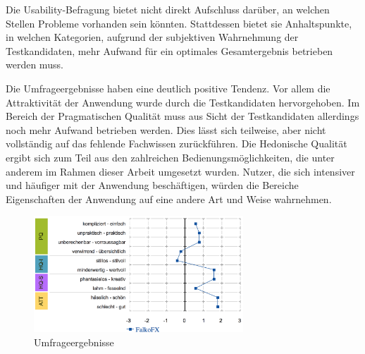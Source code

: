 Die Usability-Befragung bietet nicht direkt Aufschluss darüber, an welchen Stellen Probleme vorhanden sein könnten. Stattdessen bietet sie Anhaltspunkte, in welchen Kategorien, aufgrund der subjektiven Wahrnehmung der Testkandidaten, mehr Aufwand für ein optimales Gesamtergebnis betrieben werden muss.\par
Die Umfrageergebnisse haben eine deutlich positive Tendenz. Vor allem die Attraktivität der Anwendung wurde durch die Testkandidaten hervorgehoben. Im Bereich der Pragmatischen Qualität muss aus Sicht der Testkandidaten allerdings noch mehr Aufwand betrieben werden. Dies lässt sich teilweise, aber nicht vollständig auf das fehlende Fachwissen zurückführen. Die Hedonische Qualität ergibt sich zum Teil aus den zahlreichen Bedienungsmöglichkeiten, die unter anderem im Rahmen dieser Arbeit umgesetzt wurden. Nutzer, die sich intensiver und häufiger mit der Anwendung beschäftigen, würden die Bereiche Eigenschaften der Anwendung auf eine andere Art und Weise wahrnehmen.\par
\begin{figure}[H]
 \centering
 \includegraphics[width=0.7\textwidth]{grafiken/word_pairs.png}
 \caption{Umfrageergebnisse}
 \label{fig:surveyResults}
\end{figure}

